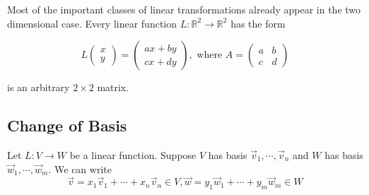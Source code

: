 Most of the important classes of linear transformations already appear in the two dimensional case. Every linear function $L: \mathbb{R}^2 \to \mathbb{R}^2$ has the form

\[ L \begin{pmatrix}x\\y\end{pmatrix} = \begin{pmatrix}ax + by\\cx + dy\end{pmatrix}, \text{ where } A = \begin{pmatrix}a & b\\c & d\end{pmatrix} \]

is an arbitrary $2 \times 2$ matrix.

    \subsection{Change of Basis}
    Let $L:V \to W$ be a linear function. Suppose $V$ has basis $\vec{v}_1, \cdots, \vec{v}_n$ and $W$ has basis $\vec{w}_1, \cdots, \vec{w}_m$. We can write
        \[ \vec{v} = x_1 \vec{v}_1 + \cdots + x_n \vec{v}_n \in V, \vec{w} = y_1 \vec{w}_1 + \cdots + y_m \vec{w}_m \in W \]
